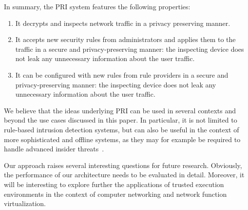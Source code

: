 \documentclass{sig-alternate-10pt}
\newcommand{\sys}{PRI\xspace}
\begin{document}
In summary, the \sys system features the following properties:
\begin{enumerate}
\item It
decrypts and inspects network traffic in a privacy preserving manner.

\item  It accepts new security rules from administrators and 
applies them to the traffic in 
a secure and privacy-preserving manner: the inspecting device does not
leak any unnecessary information about the user traffic. 

\item  It can be configured with new rules from rule providers 
in a secure and privacy-preserving manner: the inspecting device does not
 leak any unnecessary information about the user traffic. 
\end{enumerate}

We believe that the ideas underlying \sys can be used in
several contexts and beyond the use cases 
discussed in this paper.
In particular, it is not limited to rule-based intrusion detection
systems, but can also be useful in the context of more sophisticated
and offline systems, as they may for example be required
to handle advanced insider threats~\cite{insi-1,insi-2,insi-3}.

Our approach raises several interesting
questions for future research. Obviously,
the performance of our architecture needs to be
evaluated in detail. Moreover, it will be interesting
to explore further the applications of trusted
execution environments in the context of
computer networking and network function virtualization.
\end{document}
